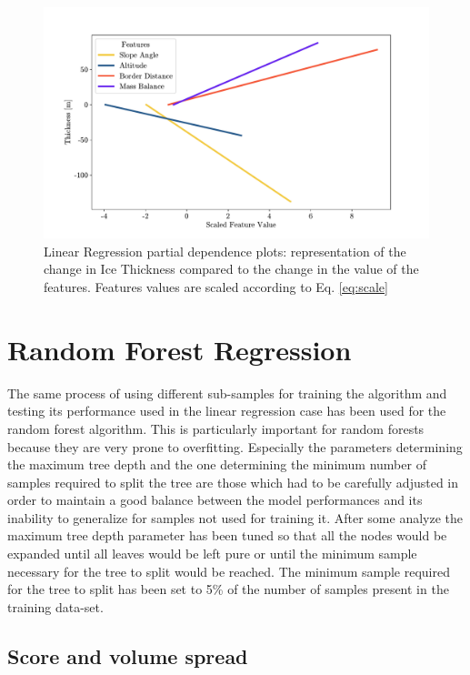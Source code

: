 \begin{figure}[!tp]
	\centering		  
	\includegraphics[width=1.\textwidth]{figures/LR_pdp.pdf}
	\caption{Linear Regression partial dependence plots: representation of the change in Ice Thickness compared to the change in the value of the features. Features values are scaled according to Eq. \ref{eq:scale}}
	\label{fig:lr-pdp}
\end{figure}

\section{Random Forest Regression}\label{rfr}
The same process of using different sub-samples for training the algorithm and testing its performance used in the linear regression case has been used for the random forest algorithm. This is particularly important for random forests because they are very prone to overfitting. Especially the parameters determining the maximum tree depth and the one determining the minimum number of samples required to split the tree are those which had to be carefully adjusted in order to maintain a good balance between the model performances and its inability to generalize for samples not used for training it. After some analyze the maximum tree depth parameter has been tuned so that all the nodes would be expanded until all leaves would be left pure or until the minimum sample necessary for the tree to split would be reached. The minimum sample required for the tree to split has been set to 5\% of the number of samples present in the training data-set.  

\subsection{Score and volume spread}\label{rfr-score}

